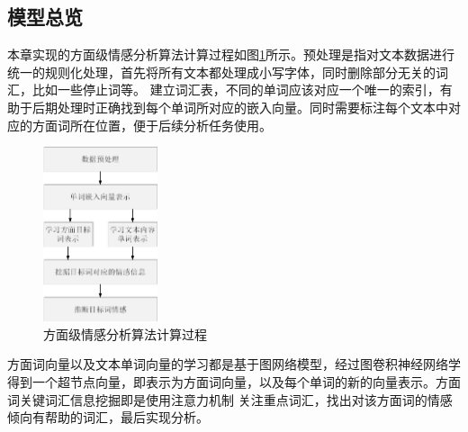 \subsection{模型总览}
本章实现的方面级情感分析算法计算过程如图\ref{asgraphLct}所示。预处理是指对文本数据进行统一的规则化处理，首先将所有文本都处理成小写字体，同时删除部分无关的词汇，比如一些停止词等。
建立词汇表，不同的单词应该对应一个唯一的索引，有助于后期处理时正确找到每个单词所对应的嵌入向量。同时需要标注每个文本中对应的方面词所在位置，便于后续分析任务使用。
\begin{figure}[htb]
	\setlength{\belowcaptionskip}{0pt}
	\centering
	\includegraphics[width=0.3\textwidth]{pic/asgraph.png}
	\caption{方面级情感分析算法计算过程}
	\label{asgraphLct}
\end{figure}
方面词向量以及文本单词向量的学习都是基于图网络模型，经过图卷积神经网络学得到一个超节点向量，即表示为方面词向量，以及每个单词的新的向量表示。方面词关键词汇信息挖掘即是使用注意力机制
关注重点词汇，找出对该方面词的情感倾向有帮助的词汇，最后实现分析。

